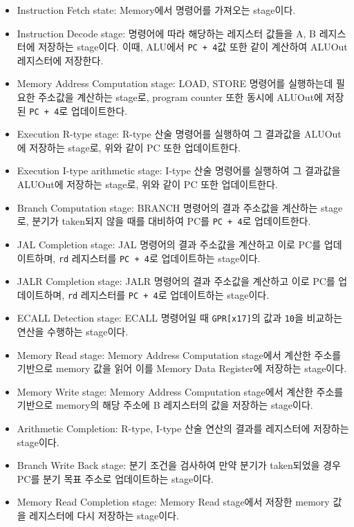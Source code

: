 \documentclass[openright, a4paper]{article}
\newcommand{\code}[1]{\texttt{#1}}
\begin{document}
\begin{itemize}
    \item Instruction Fetch state: Memory에서 명령어를 가져오는 stage이다.

    \item Instruction Decode stage: 명령어에 따라 해당하는 레지스터 값들을 A, B
    레지스터에 저장하는 stage이다. 이때, ALU에서 \code{PC + 4}값 또한 같이
    계산하여 ALUOut 레지스터에 저장한다.

    \item Memory Address Computation stage: LOAD, STORE 명령어를 실행하는데
    필요한 주소값을 계산하는 stage로, program counter 또한 동시에 ALUOut에 
    저장된 \code{PC + 4}로 업데이트한다.

    \item Execution R-type stage: R-type 산술 명령어를 실행하여 그 결과값을
    ALUOut에 저장하는 stage로, 위와 같이 PC 또한 업데이트한다.

    \item Execution I-type arithmetic stage: I-type 산술 명령어를 실행하여
    그 결과값을 ALUOut에 저장하는 stage로, 위와 같이 PC 또한 업데이트한다.

    \item Branch Computation stage: BRANCH 명령어의 결과 주소값을 계산하는
    stage로, 분기가 taken되지 않을 때를 대비하여 PC를 \code{PC + 4}로 
    업데이트한다.

    \item JAL Completion stage: JAL 명령어의 결과 주소값을 계산하고 이로 PC를 
    업데이트하며, \code{rd} 레지스터를 \code{PC + 4}로 업데이트하는 stage이다.

    \item JALR Completion stage: JALR 명령어의 결과 주소값을 계산하고 이로 PC를 
    업데이트하며, \code{rd} 레지스터를 \code{PC + 4}로 업데이트하는 stage이다.

    \item ECALL Detection stage: ECALL 명령어일 때 \code{GPR[x17]}의 값과 
    \code{10}을 비교하는 연산을 수행하는 stage이다.

    \item Memory Read stage: Memory Address Computation stage에서 계산한 주소를
    기반으로 memory 값을 읽어 이를 Memory Data Register에 저장하는 stage이다.

    \item Memory Write stage: Memory Address Computation stage에서 계산한 주소를
    기반으로 memory의 해당 주소에 B 레지스터의 값을 저장하는 stage이다.

    \item Arithmetic Completion: R-type, I-type 산술 연산의 결과를 레지스터에
    저장하는 stage이다.

    \item Branch Write Back stage: 분기 조건을 검사하여 만약 분기가 taken되었을
    경우 PC를 분기 목표 주소로 업데이트하는 stage이다.

    \item Memory Read Completion stage: Memory Read stage에서 저장한 memory 값을
    레지스터에 다시 저장하는 stage이다.

\end{itemize}
\end{document}
